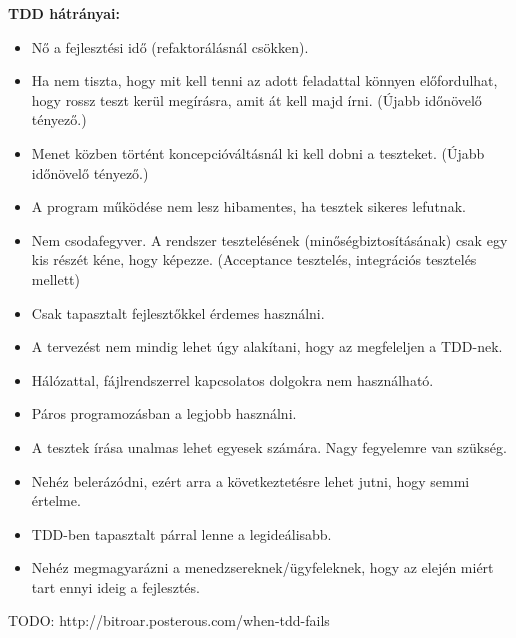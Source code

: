 \textbf{TDD hátrányai:}
\hfill\\
\begin{itemize}
\item Nő a fejlesztési idő (refaktorálásnál csökken).
\item Ha nem tiszta, hogy mit kell tenni az adott feladattal könnyen előfordulhat, hogy rossz teszt kerül megírásra, amit át kell majd írni. (Újabb időnövelő tényező.)
\item Menet közben történt koncepcióváltásnál ki kell dobni a teszteket. (Újabb időnövelő tényező.)
\item A program működése nem lesz hibamentes, ha tesztek sikeres lefutnak.
\item Nem csodafegyver. A rendszer tesztelésének (minőségbiztosításának) csak egy kis részét kéne, hogy képezze. (Acceptance tesztelés, integrációs tesztelés mellett)
\item Csak tapasztalt fejlesztőkkel érdemes használni.
\item A tervezést nem mindig lehet úgy alakítani, hogy az megfeleljen a TDD-nek.
\item Hálózattal, fájlrendszerrel kapcsolatos dolgokra nem használható.
\item Páros programozásban a legjobb használni.
\item A tesztek írása unalmas lehet egyesek számára. Nagy fegyelemre van szükség.
\item Nehéz belerázódni, ezért arra a következtetésre lehet jutni, hogy semmi értelme.
\item TDD-ben tapasztalt párral lenne a legideálisabb.
\item Nehéz megmagyarázni a menedzsereknek/ügyfeleknek, hogy az elején miért tart ennyi ideig a fejlesztés.
\end{itemize}

TODO: http://bitroar.posterous.com/when-tdd-fails


